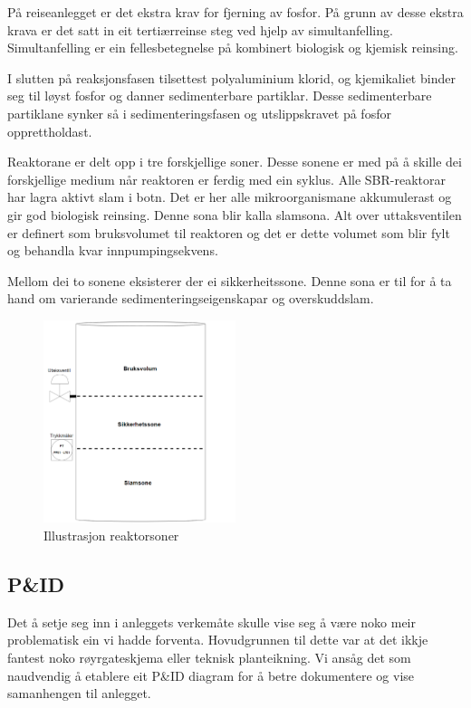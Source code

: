 På reiseanlegget er det ekstra krav for fjerning av fosfor. På grunn av desse ekstra krava
er det satt in eit tertiærreinse steg ved hjelp av simultanfelling.
Simultanfelling er ein fellesbetegnelse på kombinert biologisk og kjemisk reinsing.

I slutten på reaksjonsfasen tilsettest polyaluminium klorid, og kjemikaliet binder seg til
løyst fosfor og danner sedimenterbare partiklar. Desse sedimenterbare partiklane synker 
så i sedimenteringsfasen og utslippskravet på fosfor opprettholdast.


\newpage

Reaktorane er delt opp i tre forskjellige soner. Desse sonene er med på å skille
dei forskjellige medium når reaktoren er ferdig med ein syklus.
Alle SBR-reaktorar har lagra aktivt slam i botn. Det er her alle mikroorganismane akkumulerast
og gir god biologisk reinsing. Denne sona blir kalla slamsona.\newline
Alt over uttaksventilen er definert som bruksvolumet til reaktoren og det
er dette volumet som blir fylt og behandla kvar innpumpingsekvens.

Mellom dei to sonene eksisterer der ei sikkerheitssone.
Denne sona er til for å ta hand om varierande sedimenteringseigenskapar
og overskuddslam. \newline

\begin{figure}[htbp]
    \centering
    \includegraphics[width=0.5\textwidth]{Figurar/Reaktorsoner.png}
    \caption{Illustrasjon reaktorsoner}\label{fig:reaktorsoner}
\end{figure}

\subsection{P\&ID}

Det å setje seg inn i anleggets verkemåte skulle vise seg å være noko meir problematisk ein vi hadde forventa.
Hovudgrunnen til dette var at det ikkje fantest noko røyrgateskjema eller teknisk planteikning.
Vi ansåg det som naudvendig å etablere eit P\&ID diagram for å betre dokumentere og vise samanhengen til anlegget.

